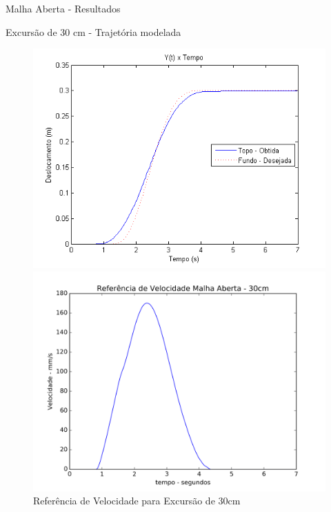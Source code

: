 \documentclass[10pt]{beamer}
\begin{document}
\begin{frame}[fragile]{Malha Aberta - Resultados}
\begin{block}{Excursão de 30 cm - Trajetória modelada}

\begin{figure}[!htb]
    \centering
    \begin{minipage}{.45\textwidth}
        \centering
        \includegraphics[width=1\linewidth]{figures/resultados/malha_aberta_1/DeslocamentoT1}
        \caption{Referência de Posição para Excursão de 30cm}
        \label{DeslocamentoT1}
    \end{minipage}%
    \hspace{0.1cm}
    \begin{minipage}{0.45\textwidth}
        \centering
        \includegraphics[width=1\linewidth]{figures/resultados/malha_aberta_1/VelocidadeT1}
        \caption{Referência de Velocidade para Excursão de 30cm}
        \label{VelocidadeT1}
    \end{minipage}
\end{figure}

\end{block}
\end{frame}
\end{document}
